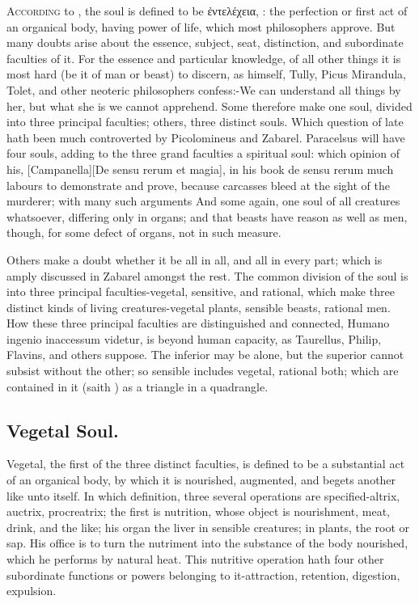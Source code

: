 {\lettrine{A}{ccording} to \Aristotle{}, the soul is defined to be \textgreek{ἐντελέχεια},
: the perfection or first act of an organical body, having
power of life, which most philosophers approve. But many doubts
arise about the essence, subject, seat, distinction, and subordinate
faculties of it. For the essence and particular knowledge, of all other
things it is most hard (be it of man or beast) to discern, as
\Aristotle himself, Tully, Picus Mirandula, Tolet,
and other neoteric philosophers confess:-We can understand all
things by her, but what she is we cannot apprehend. Some therefore make
one soul, divided into three principal faculties; others, three
distinct souls. Which question of late hath been much controverted by
Picolomineus and Zabarel.  Paracelsus will have four souls, adding
to the three grand faculties a spiritual soul: which opinion of his,
[Campanella][\textlatin{De sensu rerum et magia}], in his book de sensu rerum much labours to demonstrate
and prove, because carcasses bleed at the sight of the murderer; with
many such arguments And some again, one soul of all creatures
whatsoever, differing only in organs; and that beasts have reason as
well as men, though, for some defect of organs, not in such measure.

Others make a doubt whether it be all in all, and all in every part;
which is amply discussed in Zabarel amongst the rest. The common
division of the soul is into three principal faculties-vegetal,
sensitive, and rational, which make three distinct kinds of living
creatures-vegetal plants, sensible beasts, rational men. How these
three principal faculties are distinguished and connected, Humano
ingenio inaccessum videtur, is beyond human capacity, as 
Taurellus, Philip, Flavins, and others suppose. The inferior may be
alone, but the superior cannot subsist without the other; so sensible
includes vegetal, rational both; which are contained in it (saith
\Aristotle)  as a triangle in a quadrangle.
\subsection{Vegetal Soul.}
Vegetal, the first of the three distinct faculties, is
defined to be a substantial act of an organical body, by which it is
nourished, augmented, and begets another like unto itself. In which
definition, three several operations are specified-altrix, auctrix,
procreatrix; the first is nutrition, whose object is nourishment,
meat, drink, and the like; his organ the liver in sensible creatures;
in plants, the root or sap. His office is to turn the nutriment into
the substance of the body nourished, which he performs by natural heat.
This nutritive operation hath four other subordinate functions or
powers belonging to it-attraction, retention, digestion, expulsion.
}
